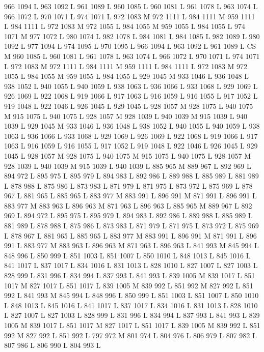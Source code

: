 {{{{{{{{{{{{{{{{{{966 1094 L
963 1092 L
961 1089 L
960 1085 L
960 1081 L
961 1078 L
963 1074 L
966 1072 L
970 1071 L
974 1071 L
972 1083 M 972 1111 L
984 1111 M 959 1111 L
984 1111 L
972 1083 M 972 1055 L
984 1055 M 959 1055 L
984 1055 L
974 1071 M 977 1072 L
980 1074 L
982 1078 L
984 1081 L
984 1085 L
982 1089 L
980 1092 L
977 1094 L
974 1095 L
970 1095 L
966 1094 L
963 1092 L
961 1089 L
CS M
960 1085 L
960 1081 L
961 1078 L
963 1074 L
966 1072 L
970 1071 L
974 1071 L
972 1083 M 972 1111 L
984 1111 M 959 1111 L
984 1111 L
972 1083 M 972 1055 L
984 1055 M 959 1055 L
984 1055 L
929 1045 M 933 1046 L
936 1048 L
938 1052 L
940 1055 L
940 1059 L
938 1063 L
936 1066 L
933 1068 L
929 1069 L
926 1069 L
922 1068 L
919 1066 L
917 1063 L
916 1059 L
916 1055 L
917 1052 L
919 1048 L
922 1046 L
926 1045 L
929 1045 L
928 1057 M 928 1075 L
940 1075 M 915 1075 L
940 1075 L
928 1057 M 928 1039 L
940 1039 M 915 1039 L
940 1039 L
929 1045 M 933 1046 L
936 1048 L
938 1052 L
940 1055 L
940 1059 L
938 1063 L
936 1066 L
933 1068 L
929 1069 L
926 1069 L
922 1068 L
919 1066 L
917 1063 L
916 1059 L
916 1055 L
917 1052 L
919 1048 L
922 1046 L
926 1045 L
929 1045 L
928 1057 M 928 1075 L
940 1075 M 915 1075 L
940 1075 L
928 1057 M 928 1039 L
940 1039 M 915 1039 L
940 1039 L
885 965 M 889 967 L
892 969 L
894 972 L
895 975 L
895 979 L
894 983 L
892 986 L
889 988 L
885 989 L
881 989 L
878 988 L
875 986 L
873 983 L
871 979 L
871 975 L
873 972 L
875 969 L
878 967 L
881 965 L
885 965 L
883 977 M 883 991 L
896 991 M 871 991 L
896 991 L
883 977 M 883 963 L
896 963 M 871 963 L
896 963 L
885 965 M 889 967 L
892 969 L
894 972 L
895 975 L
895 979 L
894 983 L
892 986 L
889 988 L
885 989 L
881 989 L
878 988 L
875 986 L
873 983 L
871 979 L
871 975 L
873 972 L
875 969 L
878 967 L
881 965 L
885 965 L
883 977 M 883 991 L
896 991 M 871 991 L
896 991 L
883 977 M 883 963 L
896 963 M 871 963 L
896 963 L
841 993 M 845 994 L
848 996 L
850 999 L
851 1003 L
851 1007 L
850 1010 L
848 1013 L
845 1016 L
841 1017 L
837 1017 L
834 1016 L
831 1013 L
828 1010 L
827 1007 L
827 1003 L
828 999 L
831 996 L
834 994 L
837 993 L
841 993 L
839 1005 M 839 1017 L
851 1017 M 827 1017 L
851 1017 L
839 1005 M 839 992 L
851 992 M 827 992 L
851 992 L
841 993 M 845 994 L
848 996 L
850 999 L
851 1003 L
851 1007 L
850 1010 L
848 1013 L
845 1016 L
841 1017 L
837 1017 L
834 1016 L
831 1013 L
828 1010 L
827 1007 L
827 1003 L
828 999 L
831 996 L
834 994 L
837 993 L
841 993 L
839 1005 M 839 1017 L
851 1017 M 827 1017 L
851 1017 L
839 1005 M 839 992 L
851 992 M 827 992 L
851 992 L
797 972 M 801 974 L
804 976 L
806 979 L
807 982 L
807 986 L
806 990 L
804 993 L
}}}}}}}}}}}}}}}}}}
